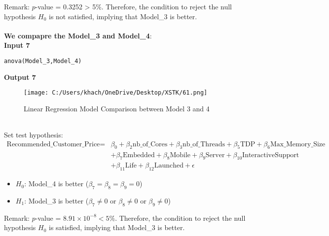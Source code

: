 \documentclass[a4paper]{article}
\begin{document}
	Remark:
	$p$-value = 0.3252 > 5\%. Therefore, the condition to reject the null hypothesis $H_0$ is not satisfied, implying that Model\_3 is better.\\
	\\
	\textbf{We compapre the Model\_3 and Model\_4}:\\
	\textbf{Input 7}
	\begin{lstlisting}[frame=single, backgroundcolor=\color{gray!10}, breaklines=true, columns=fullflexible]
	anova(Model_3,Model_4)
	\end{lstlisting}
	\textbf{Output 7}
	\begin{figure}[htbp]
		\centering
		\begin{adjustbox}{width=0.7\textwidth, frame}
			\texttt{[image: C:/Users/khach/OneDrive/Desktop/XSTK/61.png]}
		\end{adjustbox}
		\captionsetup{justification=centering}
		\vspace{0.5cm}
		\caption{Linear Regression Model Comparison between Model 3 and 4}
	\end{figure}
	\\Set test hypothesis:
	\begin{align*}
		\text{Recommended\_Customer\_Price} = & \beta_0 + \beta_2 \text{nb\_of\_Cores} + \beta_3 \text{nb\_of\_Threads} + \beta_5 \text{TDP} + \beta_6 \text{Max\_Memory\_Size} \\
		& + \beta_7 \text{Embedded} + \beta_8 \text{Mobile} + \beta_9 \text{Server} + \beta_{10} \text{InteractiveSupport} \\
		& + \beta_{11} \text{Life} + \beta_{12} \text{Launched} + \epsilon
	\end{align*}
	\begin{itemize}
		\item $H_0$: Model\_4 is better ($\beta_7 = \beta_8 = \beta_9 = 0$)
		\item $H_1$: Model\_3 is better ($\beta_7 \neq 0$ or $\beta_8 \neq 0$ or $\beta_9 \neq 0$)
	\end{itemize}
	
	Remark: 
	$p$-value = $8.91 \times 10^{-8} < 5\%$. Therefore, the condition to reject the null hypothesis $H_0$ is satisfied, implying that Model\_3 is better.
	
\end{document}
